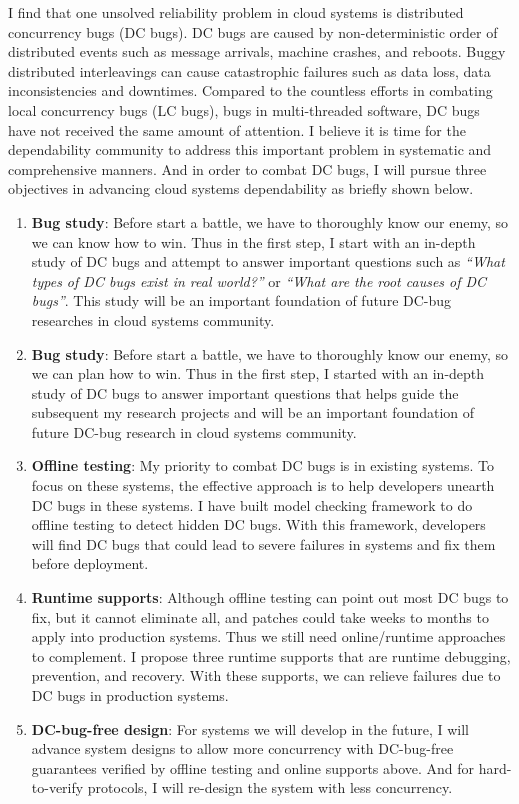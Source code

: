 \documentclass[11pt]{article}
\begin{document}
I find that one unsolved reliability problem in cloud systems is distributed
concurrency bugs (DC bugs). DC bugs are caused by non-deterministic order of
distributed events such as message arrivals, machine crashes, and reboots. Buggy
distributed interleavings can cause catastrophic failures such as data loss,
data inconsistencies and downtimes. Compared to the countless efforts in
combating local concurrency bugs (LC bugs), bugs in multi-threaded software, DC
bugs have not received the same amount of attention. I believe it is time for
the dependability community to address this important problem in systematic and
comprehensive manners. And in order to combat DC bugs, I will pursue three
objectives in advancing cloud systems dependability as briefly shown below.
\fi

\begin{enumerate}

\item \textbf{Bug study}: Before start a battle, we have to thoroughly know our
enemy, so we can know how to win. Thus in the first step, I start with an
in-depth study of DC bugs and attempt to answer important questions such as
\textit{``What types of DC bugs exist in real world?''} or \textit{``What are
the root causes of DC bugs''}. This study will be an important foundation of
future DC-bug researches in cloud systems community.
\fi

\item \textbf{Bug study}: Before start a battle, we have to thoroughly know our
enemy, so we can plan how to win. Thus in the first step, I started with an
in-depth study of DC bugs to answer important questions that helps guide the
subsequent my research projects and will be an important foundation of future
DC-bug research in cloud systems community.

\item \textbf{Offline testing}: My priority to combat DC bugs is in existing
systems. To focus on these systems, the effective approach is to help
developers unearth DC bugs in these systems. I have built model checking
framework to do offline testing to detect hidden DC bugs. With this framework,
developers will find DC bugs that could lead to severe failures in systems and
fix them before deployment.

\item \textbf{Runtime supports}: Although offline testing can point out most DC
bugs to fix, but it cannot eliminate all, and patches could take weeks to months
to apply into production systems. Thus we still need online/runtime approaches
to complement. I propose three runtime supports that are runtime debugging,
prevention, and recovery. With these supports, we can relieve failures due to DC
bugs in production systems.

\item \textbf{DC-bug-free design}: For systems we will develop in the future, I
will advance system designs to allow more concurrency with DC-bug-free
guarantees verified by offline testing and online supports above. And for
hard-to-verify protocols, I will re-design the system with less concurrency.
\fi

\end{enumerate}
\end{document}
